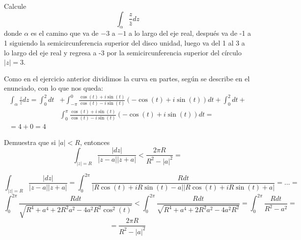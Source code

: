 \begin{problem}[3]
Calcule
\[\int_α \frac{z}{\bar{z}}dz\]
donde $α$ es el camino que va de $-3$ a $-1$ a lo largo del eje real, después va de -1 a 1 siguiendo la semicircunferencia superior del disco unidad, luego va del 1 al 3 a lo largo del eje real y regresa a -3 por la semicircunferencia superior del círculo $|z|=3$.

\solution
\newpage
{}

Como en el ejercicio anterior dividimos la curva en partes, según se describe en el enunciado, con lo que nos queda:
\begin{equation*}
\begin{aligned}
\int_α \frac{z}{\bar{z}} dz = \int_0^2dt & +\int_{-π}^0 \frac{\cos(t)+i\sin(t)}{\cos(t)-i \sin(t)}(-\cos(t) + i\sin(t))dt +\int_0^2dt+\\ & \int_0^{π} \frac{\cos(t)+i\sin(t)}{\cos(t)-i \sin(t)}(-\cos(t) + i\sin(t))dt=\\
 =4+0=4
\end{aligned}
\end{equation*}
\end{problem}

\begin{problem}[4]
Demuestra que si $|a|<R$, entonces
\[\int_{|z|=R} \frac{|dz|}{|z-a||z+a|} < \frac{2π R}{R^2-|a|^2} = \]

\solution


\[\int_{|z|=R} \frac{|dz|}{|z-a||z+a|} = \int_0^{2π}\frac{Rdt}{|R\cos(t)+iR\sin(t)-a||R\cos(t)+iR\sin(t)+a|} = ... =\]
\[\int_0^{2π}\frac{Rdt}{\sqrt{R^4+a^4+2R^2a^2-4a^2R^2\cos^2(t)}} < \int_0^{2π}\frac{Rdt}{\sqrt{R^4+a^4+2R^2a^2-4a^2R^2}} = \int_0^{2π}\frac{Rdt}{R^2-a^2}=\]
\[=\frac{2πR}{R^2-|a|^2}\]

\end{problem}

